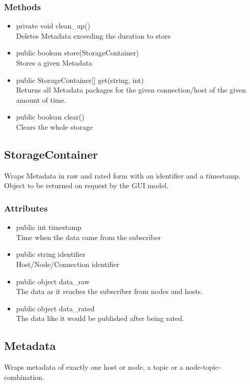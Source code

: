 \subsubsection{Methods}
\begin{itemize}
	\item private void clean_up()\\
	Deletes Metadata exceeding the duration to store
	\item public boolean store(StorageContainer)\\
	Stores a given Metadata
	\item public StorageContainer[] get(string, int)\\
	Returns all Metadata packages for the given connection/host of the given amount of time.
	\item public boolean clear()\\
	Clears the whole storage
\end{itemize}


\subsection{StorageContainer}
Wraps Metadata in raw and rated form with an identifier and a timestamp. Object to be returned on request by the GUI model.

\subsubsection{Attributes}
\begin{itemize}
	\item public int timestamp\\
	Time when the data came from the subscriber
	\item public string identifier\\
	Host/Node/Connection identifier
	\item public object data\_raw\\
	The data as it reaches the subscriber from nodes and hosts.
	\item public object data\_rated\\
	The data like it would be published after being rated.
\end{itemize}


\subsection{Metadata}
Wraps metadata of exactly one host or node, a topic or a node-topic-combination.

